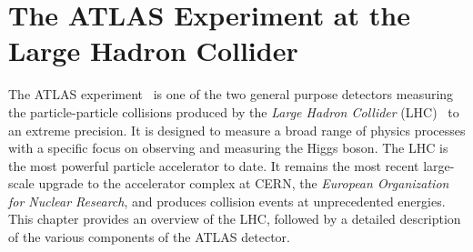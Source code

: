 
\chapter{The ATLAS Experiment at the Large Hadron Collider}
\label{chap:experiment}
The ATLAS experiment~\cite{PERF-2007-01} is one of the two general purpose detectors measuring the particle-particle collisions produced by the \emph{Large Hadron Collider} (LHC)~\cite{Evans:2008zzb} to an extreme precision. It is designed to measure a broad range of physics processes with a specific focus on observing and measuring the Higgs boson.
The LHC is the most powerful particle accelerator to date. It remains the most recent large-scale upgrade to the accelerator complex at CERN, the \emph{European Organization for Nuclear Research}, and produces collision events at unprecedented energies.
This chapter provides an overview of the LHC, followed by a detailed description of the various components of the ATLAS detector.

